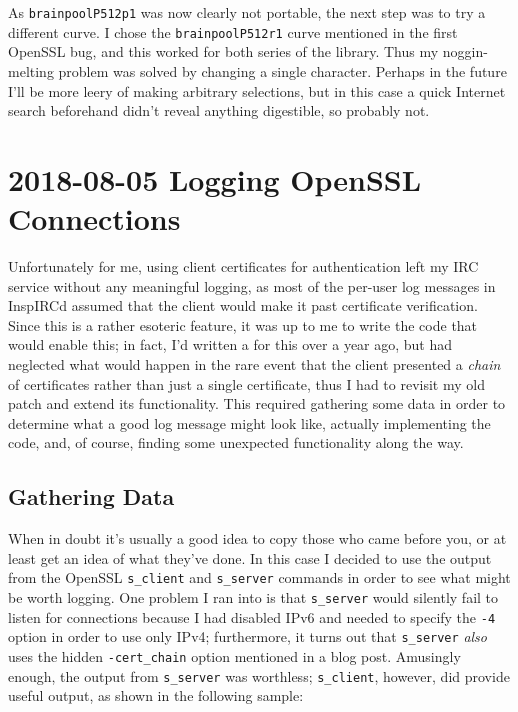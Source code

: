 \documentclass{article}
\begin{document}
As \texttt{brainpoolP512p1} was now clearly not portable, the next step was to try a different curve.  I chose the \texttt{brainpoolP512r1} curve mentioned in the first OpenSSL bug, and this worked for both series of the library.  Thus my noggin-melting problem was solved by changing a single character.  Perhaps in the future I'll be more leery of making arbitrary selections, but in this case a quick Internet search beforehand didn't reveal anything digestible, so probably not.


\section{2018-08-05 Logging OpenSSL Connections}
Unfortunately for me, using client certificates for authentication left my IRC service without any meaningful logging, as most of the per-user log messages in InspIRCd assumed that the client would make it past certificate verification.  Since this is a rather esoteric feature, it was up to me to write the code that would enable this; in fact, I'd written a  for this over a year ago, but had neglected what would happen in the rare event that the client presented a \emph{chain} of certificates rather than just a single certificate, thus I had to revisit my old patch and extend its functionality.  This required gathering some data in order to determine what a good log message might look like, actually implementing the code, and, of course, finding some unexpected functionality along the way.

\subsection{Gathering Data}
When in doubt it's usually a good idea to copy those who came before you, or at least get an idea of what they've done.  In this case I decided to use the output from the OpenSSL \texttt{s_client} and \texttt{s_server} commands in order to see what might be worth logging.  One problem I ran into is that \texttt{s_server} would silently fail to listen for connections because I had disabled IPv6 and needed to specify the \texttt{-4} option in order to use only IPv4; furthermore, it turns out that \texttt{s_server} \emph{also} uses the hidden \texttt{-cert_chain} option mentioned in a  blog post.  Amusingly enough, the output from \texttt{s_server} was worthless; \texttt{s_client}, however, did provide useful output, as shown in the following sample:
\end{document}
